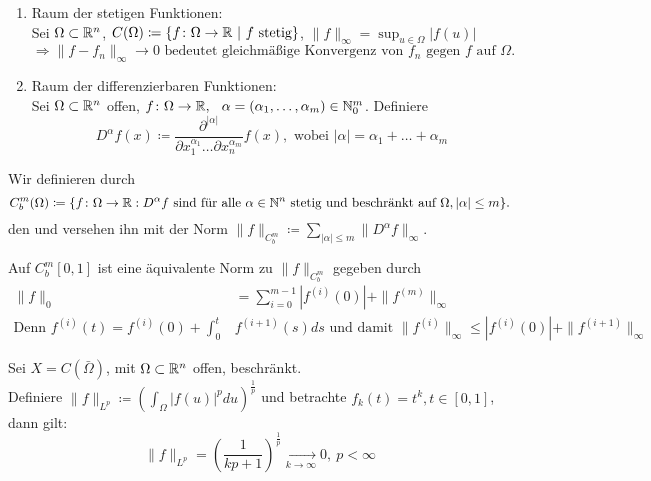 \begin{beispiel}
	\begin{enumerate}[label=\alph*\upshape)]
		\item Raum der stetigen Funktionen:  \\
		Sei $\Omega \subset \mathbb{R}^{n}$, $C(\Omega) \coloneqq \{ f \colon \Omega \rightarrow \mathbb{R} \text{ | } f \text{ stetig} \}$, $\| f \|_{\infty} = \sup_{u \in \Omega} |f(u)|$
		\[ \Rightarrow \| f - f_{n} \|_{\infty} \rightarrow 0 \text{ bedeutet gleichmä{\ss}ige Konvergenz von } f_{n} \text{ gegen } f \text{ auf } \Omega. \]
		\item Raum der differenzierbaren Funktionen:  \\
		Sei $\Omega \subset \mathbb{R}^{n}$ offen, $f \colon \Omega \rightarrow \mathbb{R}, \hspace{0.25cm} \alpha = (\alpha_{1}, \dotsc, \alpha_{m}) \in \mathbb{N}_{0}^{m}$. Definiere
		\[ D^{\alpha}f(x) \coloneqq \frac{ \partial^{ | \alpha | } }{ \partial x_{1}^{ \alpha_{1} } \dotsc \partial x_{n}^{ \alpha_{m} } } f(x), \text{ wobei } | \alpha | = \alpha_{1} + \dotsc + \alpha_{m} \] 
	\end{enumerate}
\end{beispiel}


\begin{definition}
	Wir definieren durch
		\[ C_{b}^{m}(\Omega) \coloneqq \{ f \colon \Omega \rightarrow \mathbb{R} : D^{\alpha}f \text{ sind für alle } \alpha \in \mathbb{N}^{n} \text{ stetig und beschränkt auf } \Omega, |\alpha| \leq m \}. \]	
	den  und versehen ihn mit der Norm $\| f \|_{C_{b}^{m}} \coloneqq \sum_{|\alpha| \leq m} \| D^{\alpha}f \|_{\infty}$.
\end{definition}


\begin{bemerkung}
	Auf $C_{b}^{m} [0, 1]$ ist eine äquivalente Norm zu  $\| f \|_{C_{b}^{m}}$ gegeben durch
	\begin{align*}
		\| f \|_{0} & = \sum_{i = 0}^{m - 1} |f^{(i)}(0)| + \| f^{(m)} \|_{\infty} \\
		\text{Denn } f^{(i)}(t) = f^{(i)}(0) + \int_{0}^{t} & f^{(i + 1)}(s) ds \text{ und damit } \| f^{(i)}\|_{\infty} \leq | f^{(i)}(0) | + \| f^{(i + 1)}\|_{\infty}	
	\end{align*}
\end{bemerkung}


\begin{beispiel}
	Sei $X = C(\bar\Omega)$, mit $\Omega \subset \mathbb{R}^{n}$ offen, beschränkt. \\
	Definiere $\| f \|_{L^{p}} \coloneqq \left( \int_{\Omega} |f(u)|^{p} du \right)^{\frac{1}{p}}$ und betrachte $f_{k}(t) = t^k, t \in [0, 1]$, dann gilt:
 	\[ \| f \|_{L^{p}} = \left( \frac{1}{kp + 1} \right)^{\frac{1}{p}} \xrightarrow[k \rightarrow \infty]{} 0, ~ p < \infty \]
\end{beispiel}


